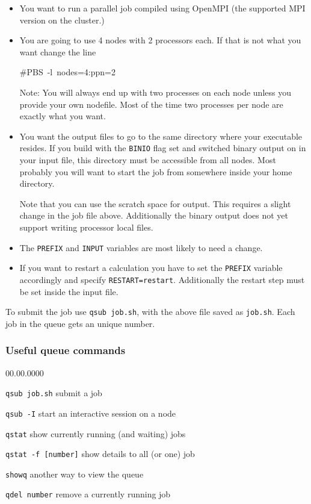 \begin{itemize}
\item You want to run a parallel job compiled using OpenMPI (the supported
MPI version on the cluster.)
\item You are going to use 4 nodes with 2 processors each. If that is not
what you want change the line

\begin{lyxcode}
\#PBS~-l~nodes=4:ppn=2
\end{lyxcode}
Note: You will always end up with two processes on each node unless
you provide your own nodefile. Most of the time two processes per
node are exactly what you want.

\item You want the output files to go to the same directory where your \ccarat{}
executable resides. If you build \ccarat{} with the \texttt{BINIO}
flag set and switched binary output on in your input file, this directory
must be accessible from all nodes. Most probably you will want to
start the job from somewhere inside your home directory.


Note that you can use the scratch space for output. This requires
a slight change in the job file above. Additionally the binary output
does not yet support writing processor local files.

\item The \texttt{PREFIX} and \texttt{INPUT} variables are most likely to
need a change.
\item If you want to restart a calculation you have to set the \texttt{PREFIX}
variable accordingly and specify \texttt{RESTART=restart}. Additionally
the restart step must be set inside the input file.
\end{itemize}
To submit the job use \texttt{qsub job.sh}, with the above file saved
as \texttt{job.sh}. Each job in the queue gets an unique number.


\subsubsection{Useful queue commands}

\begin{lyxlist}{00.00.0000}
\item [{\texttt{qsub~job.sh}}] submit a job
\item [{\texttt{qsub~-I}}] start an interactive session on a node
\item [{\texttt{qstat}}] show currently running (and waiting) jobs
\item [{\texttt{qstat~-f~{[}number]}}] show details to all (or one) job
\item [{\texttt{showq}}] another way to view the queue
\item [{\texttt{qdel~number}}] remove a currently running job
\end{lyxlist}

